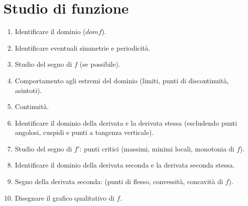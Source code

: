 \chapter{Studio di funzione}
\begin{enumerate}
\item Identificare il dominio ($domf$).
\item Identificare eventuali simmetrie e periodicit\`a.
\item Studio del segno di $f$ (se possibile).
\item Comportamento agli estremi del dominio (limiti, punti di discontinuit\`a, asintoti).
\item Continuit\`a.
\item Identificare il dominio della derivata e la derivata stessa (escludendo punti angolosi, cuspidi e punti a tangenza verticale).
\item Studio del segno di $f'$: punti critici (massimi, minimi locali, monotonia di $f$).
\item Identificare il dominio della derivata seconda e la derivata seconda stessa.
\item Segno della derivata seconda: (punti di flesso, convessit\`a, concavit\`a di $f$).
\item Disegnare il grafico qualitativo di $f$.
\end{enumerate}